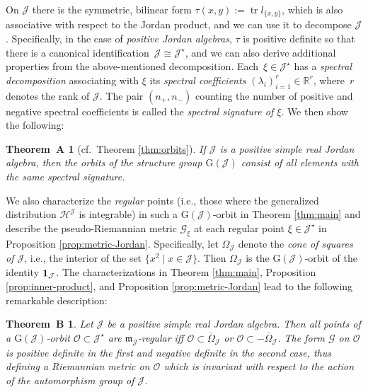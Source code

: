 \documentclass[10pt,a4paper]{amsart}
\numberwithin{equation}{section}
\newtheorem*{TheoremA*}{Theorem~A}
\newtheorem*{TheoremB*}{Theorem~B}
\newcommand{\hh}{\mathcal{H}}
\newcommand{\ocal}{\mathcal{O}}
\newcommand{\Jcal}{\mathcal{J}}
\newcommand{\m}{\mathfrak{m}}
\newcommand{\G}{\mathrm{G}}
\newcommand{\R}{{\mathbb R}}
\renewcommand{\m}{{\mathfrak m}}
\newcommand{\Gcal}{\mathcal{G}}
\begin{document}
On $\Jcal$ there is the symmetric, bilinear form $\tau(x,y) := \operatorname{tr} l_{\{x, y\}}$, which is also associative with respect to the Jordan product, and we can use it to decompose $\Jcal$ \cite[p.~59]{Koecher-1999}.
Specifically, in the case of {\em positive Jordan algebras}, $\tau$ is positive definite so that there is a canonical identification~${\Jcal \cong \Jcal^\star}$, and we can also derive additional properties from the above-mentioned decomposition.
Each~$\xi \in \Jcal^\star$ has a {\em spectral decomposition} associating with $\xi$ its {\em spectral coefficients $(\lambda_i)_{i=1}^r \in \R^r$}, where~$r$ denotes the rank of $\Jcal$. The pair $(n_+, n_-)$ counting the number of positive and negative spectral coefficients is called the {\em spectral signature of $\xi$}. We then show the following:

\begin{TheoremA*}[cf.\ Theorem \ref{thm:orbits}]
If $\Jcal$ is a positive simple real Jordan algebra, then the orbits of the structure group $\G(\Jcal)$ consist of all elements with the same spectral signature.
\end{TheoremA*}

We also characterize the {\em regular }points (i.e., those where the
generalized distribution $\hh^\Jcal$ is integrable) in such a $\G(\Jcal)$-orbit in Theorem \ref{thm:main} and describe the pseudo-Riemannian metric $\Gcal_\xi$ at each regular point $\xi \in \Jcal^\star$ in Proposition \ref{prop:metric-Jordan}.
Specifically, let $\Omega_\Jcal$ denote the {\em cone of squares of $\Jcal$}, i.e., the interior of the set $\big\{x^2 \mid x \in \Jcal\big\}$. Then $\Omega_\Jcal$ is the $\G(\Jcal)$-orbit of the identity ${\bf 1}_\Jcal$.
 The characterizations in Theorem \ref{thm:main}, Proposition \ref{prop:inner-product}, and Proposition \ref{prop:metric-Jordan} lead to the following remarkable description:

\begin{TheoremB*} Let $\Jcal$ be a positive simple real Jordan
 algebra. Then all points of a $\G(\Jcal)$-orbit $\ocal \subset \Jcal^\star$ are $\m_{\Jcal}$-regular iff $\ocal \subset \overline{\Omega}_\Jcal$ or $\ocal \subset -\overline{\Omega}_\Jcal$. The form $\Gcal$ on $\ocal$ is positive definite in the first and negative definite in the second case, thus defining a Riemannian metric on $\ocal$ which is invariant with respect to the action of the automorphism group of $\Jcal$.
\end{TheoremB*}
\end{document}
